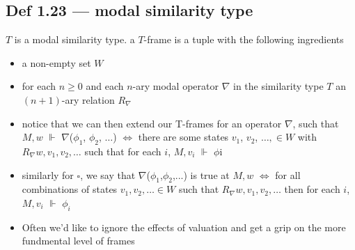 \documentclass[10pt, a4paper, twoside]{article}
\begin{document}
\subsection{Def 1.23 --- modal similarity type}
$T$ is a modal similarity type. a $T$-frame is a tuple with the following ingredients
\begin{itemize}
  \item a non-empty set $W$
  \item for each $n \geq 0$ and each $n$-ary modal operator $\nabla$ in the similarity type $T$ an $(n+1)$-ary relation $R_\nabla$
  \item notice that we can then extend our T-frames for an operator $\nabla$, such that $M, w$ $\Vdash$ $\nabla$($\phi_1$, $\phi_2$, $\ldots$) $\iff$ there are some states $v_1$, $v_2$, $\ldots, \in W$ with $R_\nabla w,v_1,v_2,\ldots$ such that for each $i$, $M,v_i$ $\Vdash$ $\phi$i
  \item similarly for $\square$, we say that $\nabla$($\phi_1$,$\phi_2$,...) is true at $M,w$ $\iff$ for all combinations of states $v_1,v_2,\ldots \in W$ such that $R_\nabla w,v_1,v_2,\ldots$ then for each $i$, $M,v_i$ $\Vdash$ $\phi_i$
  \item Often we’d like to ignore the effects of valuation and get a grip on the more fundmental level of frames
\end{itemize}
\end{document}
